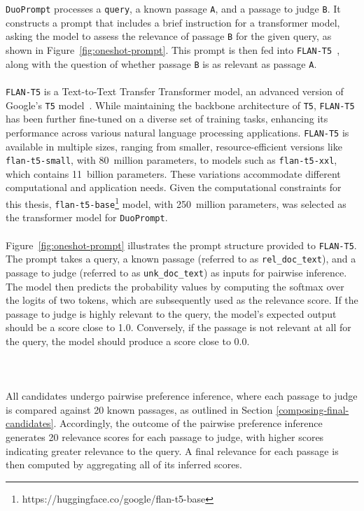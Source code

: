 \\\\
\texttt{DuoPrompt} processes a \texttt{query}, a known passage \texttt{A}, and a passage to judge \texttt{B}. It constructs a prompt that includes a brief instruction for a transformer model, asking the model to assess the relevance of passage \texttt{B} for the given query, as shown in Figure~\ref{fig:oneshot-prompt}. This prompt is then fed into \mbox{\texttt{FLAN-T5}~\citep{chung:2022}}, along with the question of whether passage \texttt{B} is as relevant as passage \texttt{A}.
\\\\
\texttt{FLAN-T5} is a Text-to-Text Transfer Transformer model, an advanced version of Google's \texttt{T5} model~\citep{raffel:2020}. While maintaining the backbone architecture of \texttt{T5}, \texttt{FLAN-T5} has been further fine-tuned on a diverse set of training tasks, enhancing its performance across various natural language processing applications. \texttt{FLAN-T5} is available in multiple sizes, ranging from smaller, resource-efficient versions like \texttt{flan-t5-small}, with 80~million parameters, to models such as \texttt{flan-t5-xxl}, which contains 11~billion parameters. These variations accommodate different computational and application needs. Given the computational constraints for this thesis, \texttt{flan-t5-base}\footnote{https://huggingface.co/google/flan-t5-base} model, with 250~million parameters, was selected as the transformer model for \texttt{DuoPrompt}.
\\\\
Figure~\ref{fig:oneshot-prompt} illustrates the prompt structure provided to \texttt{FLAN-T5}. The prompt takes a query, a known passage (referred to as \texttt{rel\_doc\_text}), and a passage to judge (referred to as \texttt{unk\_doc\_text}) as inputs for pairwise inference. The model then predicts the probability values by computing the softmax over the logits of two tokens, which are subsequently used as the relevance score. If the passage to judge is highly relevant to the query, the model's expected output should be a score close to 1.0. Conversely, if the passage is not relevant at all for the query, the model should produce a score close to 0.0.
\\\\\\\\
All candidates undergo pairwise preference inference, where each passage to judge is compared against 20 known passages, as outlined in Section \ref{composing-final-candidates}. Accordingly, the outcome of the pairwise preference inference generates 20 relevance scores for each passage to judge, with higher scores indicating greater relevance to the query. A final relevance for each passage is then computed by aggregating all of its inferred scores.
